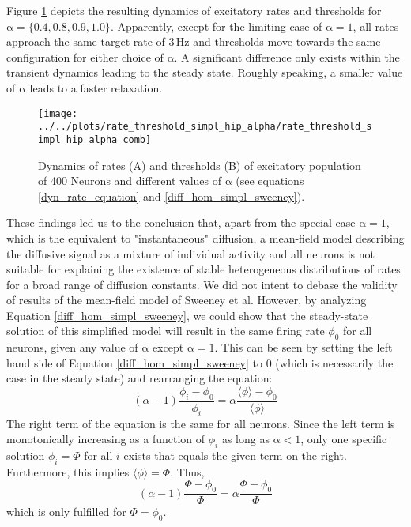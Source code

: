 \documentclass[10pt,a4paper]{article}
\begin{document}
Figure \ref{dynamics_rate_threshold_dyn_mean_field_sweeney} depicts the resulting dynamics of excitatory rates and thresholds for $\mathrm{\alpha=\lbrace 0.4,0.8,0.9,1.0\rbrace}$. Apparently, except for the limiting case of $\mathrm{\alpha=1}$, all rates approach the same target rate of $\mathrm{3\,Hz}$ and thresholds move towards the same configuration for either choice of $\mathrm{\alpha}$. A significant difference only exists within the transient dynamics leading to the steady state. Roughly speaking, a smaller value of $\mathrm{\alpha}$ leads to a faster relaxation.
\begin{figure}
\texttt{[image: ../../plots/rate\_threshold\_simpl\_hip\_alpha/rate\_threshold\_simpl\_hip\_alpha\_comb]}
\caption{Dynamics of rates (A) and thresholds (B) of excitatory population of 400 Neurons and different values of $\mathrm{\alpha}$ (see equations \eqref{dyn_rate_equation} and \eqref{diff_hom_simpl_sweeney}).}
\label{dynamics_rate_threshold_dyn_mean_field_sweeney}
\end{figure}
These findings led us to the conclusion that, apart from the special case $\mathrm{\alpha=1}$, which is the equivalent to "instantaneous" diffusion, a mean-field model describing the diffusive signal as a mixture of individual activity and all neurons is not suitable for explaining the existence of stable heterogeneous distributions of rates for a broad range of diffusion constants. We did not intent to debase the validity of results of the mean-field model of Sweeney et al. However, by analyzing Equation \ref{diff_hom_simpl_sweeney}, we could show that the steady-state solution of this simplified model will result in the same firing rate $\phi_0$ for all neurons, given any value of $\mathrm{\alpha}$ except $\mathrm{\alpha=1}$. This can be seen by setting the left hand side of Equation \eqref{diff_hom_simpl_sweeney} to $0$ (which is necessarily the case in the steady state) and rearranging the equation:
\begin{equation}
(\alpha-1)\frac{\phi_i - \phi_0}{\phi_i} = \alpha \frac{\langle \phi \rangle - \phi_0}{\langle \phi \rangle}
\label{diff_hom_simpl_sweeney_2}
\end{equation}
The right term of the equation is the same for all neurons. Since the left term is monotonically increasing as a function of $\phi_i$ as long as $\mathrm{\alpha<1}$, only one specific solution $\phi_i = \Phi$ for all $i$ exists that equals the given term on the right. Furthermore, this implies $\langle \phi \rangle = \Phi$. Thus,
\begin{equation}
(\alpha-1)\frac{\Phi - \phi_0}{\Phi} = \alpha \frac{\Phi - \phi_0}{\Phi}
\label{diff_hom_simpl_sweeney_3}
\end{equation}
which is only fulfilled for $\Phi = \phi_0$.
\end{document}
